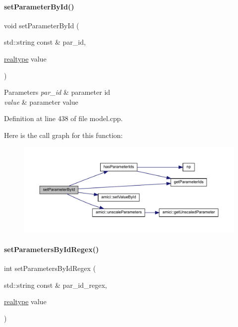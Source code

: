 \paragraph{\texorpdfstring{setParameterById()}{setParameterById()}}
{\footnotesize\ttfamily void set\+Parameter\+By\+Id (\begin{DoxyParamCaption}\item[{std\+::string const \&}]{par\+\_\+id,  }\item[{\mbox{\hyperlink{namespaceamici_a1bdce28051d6a53868f7ccbf5f2c14a3}{realtype}}}]{value }\end{DoxyParamCaption})}


\begin{DoxyParams}{Parameters}
{\em par\+\_\+id} & parameter id \\
\hline
{\em value} & parameter value \\
\hline
\end{DoxyParams}


Definition at line 438 of file model.\+cpp.

Here is the call graph for this function\+:
\nopagebreak
\begin{figure}[H]
\begin{center}
\leavevmode
\includegraphics[width=350pt]{classamici_1_1_model_a995357a19663980279249d4b89a88f7a_cgraph}
\end{center}
\end{figure}
\mbox{\label{classamici_1_1_model_ab66d6b754637ed68449af96f5887a0be}} 
\paragraph{\texorpdfstring{setParametersByIdRegex()}{setParametersByIdRegex()}}
{\footnotesize\ttfamily int set\+Parameters\+By\+Id\+Regex (\begin{DoxyParamCaption}\item[{std\+::string const \&}]{par\+\_\+id\+\_\+regex,  }\item[{\mbox{\hyperlink{namespaceamici_a1bdce28051d6a53868f7ccbf5f2c14a3}{realtype}}}]{value }\end{DoxyParamCaption})}


